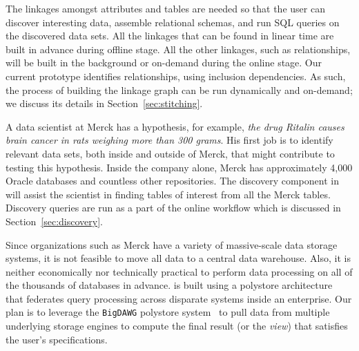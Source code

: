  The linkages amongst attributes and tables are needed so that the user can discover interesting data, assemble relational schemas, and run \textsf{SQL} queries on the discovered data sets. All the linkages that can be found in linear time are built in advance during offline stage. 
  All the other linkages, such as \pkfk relationships, will be built in the background or on-demand during the online stage. Our current prototype identifies \pkfk relationships, using inclusion dependencies. As such, the process of building the linkage graph can be run dynamically and on-demand; we discuss its details in Section~\ref{sec:stitching}.




\stitle{[Discovery.]} A data scientist at Merck has a hypothesis, for example, {\it the drug Ritalin causes brain cancer in rats weighing more than 300 grams}.
His first job is to identify relevant data sets, both inside and outside of Merck, that might contribute to testing this hypothesis. Inside the company alone, Merck has approximately 4,000 Oracle databases and countless other repositories. The discovery component in \dcv will assist the scientist in finding tables of interest from all the Merck tables. Discovery queries are run as a part of the online workflow which is discussed in Section~\ref{sec:discovery}.






Since organizations such as  Merck have a variety of massive-scale data storage systems, it is not feasible to move all data to a central data warehouse. Also, it is neither economically nor technically practical to perform data processing on all of the thousands of databases in advance. 
\dcv is built using a polystore architecture~\cite{DBLP:journals/sigmod/DugganESBHKMMMZ15} that federates query processing across disparate systems inside an enterprise. Our plan is to leverage the \texttt{BigDAWG} polystore system~\cite{DBLP:journals/pvldb/ElmoreDSBCGHHKK15} to pull data from multiple underlying storage engines to compute the final result (or the {\em view}) that satisfies the user's specifications.


